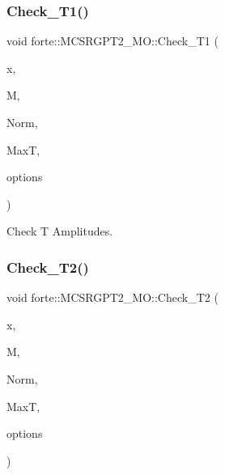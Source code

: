 \subsubsection{\texorpdfstring{Check\+\_\+\+T1()}{Check\_T1()}}
{\footnotesize\ttfamily void forte\+::\+M\+C\+S\+R\+G\+P\+T2\+\_\+\+M\+O\+::\+Check\+\_\+\+T1 (\begin{DoxyParamCaption}\item[{const std\+::string \&}]{x,  }\item[{const \mbox{\hyperlink{mcsrgpt2__mo_8h_ae5de8a172a3b363a852d6d32e6d90537}{d2}} \&}]{M,  }\item[{double \&}]{Norm,  }\item[{double \&}]{MaxT,  }\item[{std\+::shared\+\_\+ptr$<$ \mbox{\hyperlink{classforte_1_1_forte_options}{Forte\+Options}} $>$}]{options }\end{DoxyParamCaption})\hspace{0.3cm}{\ttfamily [protected]}}



Check T Amplitudes. 

\mbox{\label{classforte_1_1_m_c_s_r_g_p_t2___m_o_a4c21e5482c787306d1bfc356577149ca}} 
\subsubsection{\texorpdfstring{Check\+\_\+\+T2()}{Check\_T2()}}
{\footnotesize\ttfamily void forte\+::\+M\+C\+S\+R\+G\+P\+T2\+\_\+\+M\+O\+::\+Check\+\_\+\+T2 (\begin{DoxyParamCaption}\item[{const std\+::string \&}]{x,  }\item[{const \mbox{\hyperlink{mcsrgpt2__mo_8h_a0a2245afece5cd37d3b0b6a462927f69}{d4}} \&}]{M,  }\item[{double \&}]{Norm,  }\item[{double \&}]{MaxT,  }\item[{std\+::shared\+\_\+ptr$<$ \mbox{\hyperlink{classforte_1_1_forte_options}{Forte\+Options}} $>$}]{options }\end{DoxyParamCaption})\hspace{0.3cm}{\ttfamily [protected]}}

